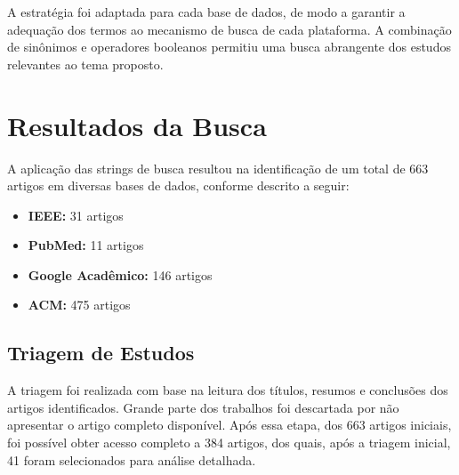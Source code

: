 \documentclass[a4paper,12pt]{article}
\begin{document}
A estratégia foi adaptada para cada base de dados, de modo a garantir a adequação dos termos ao mecanismo de busca de cada plataforma. A combinação de sinônimos e operadores booleanos permitiu uma busca abrangente dos estudos relevantes ao tema proposto.

\section{Resultados da Busca}
A aplicação das strings de busca resultou na identificação de um total de 663 artigos em diversas bases de dados, conforme descrito a seguir:

\begin{itemize}
    \item \textbf{IEEE:} 31 artigos
    \item \textbf{PubMed:} 11 artigos
    \item \textbf{Google Acadêmico:} 146 artigos
    \item \textbf{ACM:} 475 artigos
\end{itemize}





\subsection{Triagem de Estudos}
A triagem foi realizada com base na leitura dos títulos, resumos e conclusões dos artigos identificados. Grande parte dos trabalhos foi descartada por não apresentar o artigo completo disponível. Após essa etapa, dos 663 artigos iniciais, foi possível obter acesso completo a 384 artigos, dos quais, após a triagem inicial, 41 foram selecionados para análise detalhada.
\end{document}

